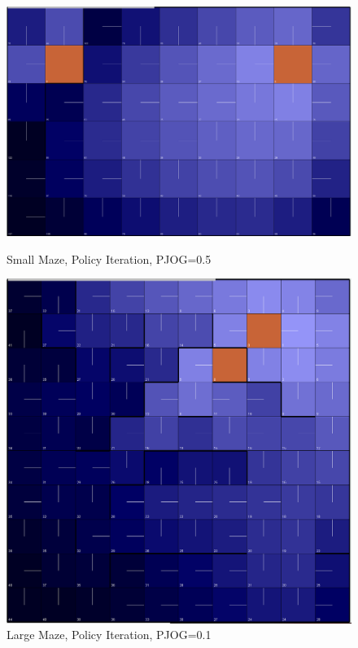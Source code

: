\documentclass[11pt]{article}
\begin{document}
\begin{figure}[!htb]
   \begin{minipage}{0.4\textwidth}
     \centering
     \includegraphics[width=1.2\linewidth]{../figures/policy1_5.png}
     \caption{Small Maze, Policy Iteration, PJOG=0.5}\label{Fig:policy1_5}
   \end{minipage}\hfill
   \begin{minipage}{0.4\textwidth}
     \centering
     \includegraphics[width=1.2\linewidth]{../figures/policy2_1.png}
     \caption{Large Maze, Policy Iteration, PJOG=0.1}\label{Fig:policy2_1}
   \end{minipage}
\end{figure}
\end{document}
